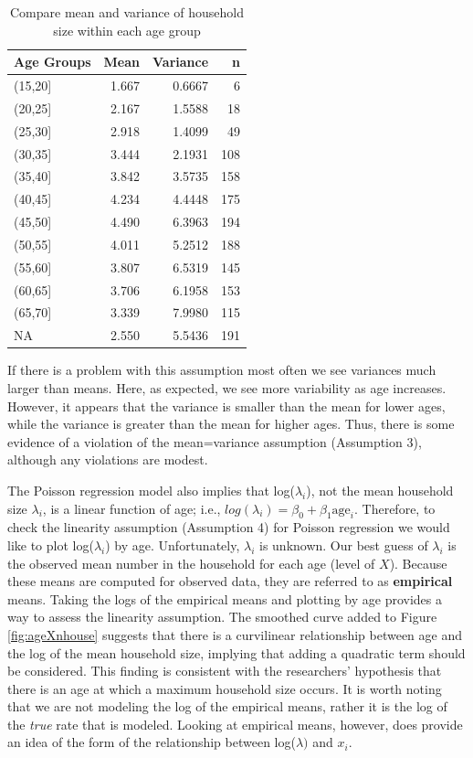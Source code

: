 \documentclass[
]{krantz}
\begin{document}
\begin{table}[t]

\caption{\label{tab:table1chp4}Compare mean and variance of household size within each age group}
\centering
\begin{tabular}{lrrr}
\toprule
Age Groups & Mean & Variance & n\\
\midrule
(15,20] & 1.667 & 0.6667 & 6\\
(20,25] & 2.167 & 1.5588 & 18\\
(25,30] & 2.918 & 1.4099 & 49\\
(30,35] & 3.444 & 2.1931 & 108\\
(35,40] & 3.842 & 3.5735 & 158\\
\addlinespace
(40,45] & 4.234 & 4.4448 & 175\\
(45,50] & 4.490 & 6.3963 & 194\\
(50,55] & 4.011 & 5.2512 & 188\\
(55,60] & 3.807 & 6.5319 & 145\\
(60,65] & 3.706 & 6.1958 & 153\\
\addlinespace
(65,70] & 3.339 & 7.9980 & 115\\
NA & 2.550 & 5.5436 & 191\\
\bottomrule
\end{tabular}
\end{table}

If there is a problem with this assumption most often we see variances much larger than means. Here, as expected, we see more variability as age increases. However, it appears that the variance is smaller than the mean for lower ages, while the variance is greater than the mean for higher ages. Thus, there is some evidence of a violation of the mean=variance assumption (Assumption 3), although any violations are modest.

The Poisson regression model also implies that log(\(\lambda_i\)), not the mean household size \(\lambda_i\), is a linear function of age; i.e., \(log(\lambda_i)=\beta_0+\beta_1\textrm{age}_i\). Therefore, to check the linearity assumption (Assumption 4) for Poisson regression we would like to plot log(\(\lambda_i\)) by age. Unfortunately, \(\lambda_i\) is unknown. Our best guess of \(\lambda_i\) is the observed mean number in the household for each age (level of \(X\)). Because these means are computed for observed data, they are referred to as \textbf{empirical} means. Taking the logs of the empirical means and plotting by age provides a way to assess the linearity assumption. The smoothed curve added to Figure \ref{fig:ageXnhouse} suggests that there is a curvilinear relationship between age and the log of the mean household size, implying that adding a quadratic term should be considered. This finding is consistent with the researchers' hypothesis that there is an age at which a maximum household size occurs. It is worth noting that we are not modeling the log of the empirical means, rather it is the log of the \emph{true} rate that is modeled. Looking at empirical means, however, does provide an idea of the form of the relationship between log(\(\lambda)\) and \(x_i\).
\end{document}
